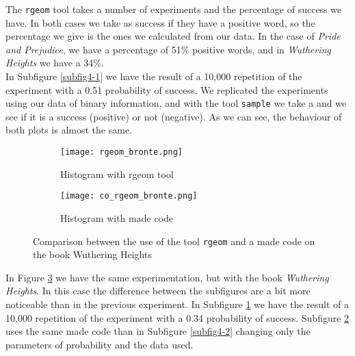 \documentclass{article}
\begin{document}
The \texttt{rgeom} tool takes a number of experiments and the percentage of success we have. In both cases we take as success if they have a positive word, so the percentage we give is the ones we calculated from our data. In the case of \textit{Pride and Prejudice}, we have a percentage of 51\% positive words, and in \textit{Wuthering Heights} we have a 34\%. \\

In Subfigure \ref{subfig4-1} we have the result of a 10,000 repetition of the experiment with a 0.51 probability of success. We replicated the experiments using our data of binary information, and with the tool \texttt{sample} we take a  and we see if it is a success (positive) or not (negative). As we can see, the behaviour of both plots is almost the same. \\


\begin{figure}[]
\begin{subfigure}{.5\textwidth}
  \centering
  \texttt{[image: rgeom\_bronte.png]}  
  \caption{Histogram with rgeom tool}
  \label{subfig5-1}
\end{subfigure}
\begin{subfigure}{.5\textwidth}
  \centering
  \texttt{[image: co\_rgeom\_bronte.png]}  
  \caption{Histogram with made code}
  \label{subfig5-2}
\end{subfigure}
\caption{Comparison between the use of the tool \texttt{rgeom} and a made code on the book Wuthering Heights}
\label{fig5}
\end{figure}


In Figure \ref{fig5} we have the same experimentation, but with the book \textit{Wuthering Heights}. In this case the difference between the subfigures are a bit more noticeable than in the previous experiment. In Subfigure \ref{subfig5-1} we have the result of a 10,000 repetition of the experiment with a 0.34 probability of success. Subfigure \ref{subfig5-2} uses the same made code than in Subfigure \ref{subfig4-2} changing only the parameters of probability and the data used.\\
\end{document}
